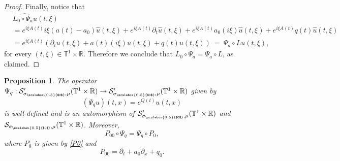 \documentclass[11pt,reqno]{amsart}
\numberwithin{equation}{section}
\newtheorem{prop}[theorem]{Proposition}
\theoremstyle{definition}
\theoremstyle{definition}
\newcommand{\T}{\mathbb{T}}
\newcommand{\R}{\mathbb{R}}
\newcommand{\g}{\mathbb{T}^1\times\mathbb{R}}
\newcommand{\scoef}{\mathcal{S}_{\sigma_{\scalebox{0.5}{$0$}},\mu}(\g)}
\newcommand{\sscoef}{\mathcal{S}'_{\sigma_{\scalebox{0.5}{$0$}},\mu}(\g)}
\begin{document}
\begin{proof}
          Finally, notice that 
     \begin{align*}
         & \widehat{L_{0}\circ\Psi_a u}(t,\xi) \\
         & =e^{i\xi A(t)}i\xi(a(t)-a_0)\widehat{u}(t,\xi)+e^{i\xi A(t)}\partial_t\widehat{u}(t,\xi)+e^{i\xi A(t)}a_0(i\xi)\widehat{u}(t,\xi)+e^{i\xi A(t)}q(t)\widehat{u}(t,\xi) \\
         & =e^{i\xi A(t)}(\partial_tu(t,\xi)+a(t)(i\xi)u(t,\xi)+q(t)u(t,\xi)) \ =\ \widehat{\Psi_a\circ L u}(t,\xi),
     \end{align*}
     for every $(t,\xi)\in\T^1\times \R$. Therefore we conclude that $L_0\circ\Psi_a=\Psi_a\circ L$, as claimed.
\end{proof}



\begin{prop}\label{prop_Psiq}
    The operator $\Psi_q:\sscoef\to\sscoef$ given by
    \[(\Psi_q u)(t,x) = e^{Q(t)}u(t,x)\]
    is well-defined and is an automorphism of $\sscoef$ and $\scoef$. Moreover,
    \[P_{00}\circ\Psi_q = \Psi_q\circ P_0,\]
    where $P_0$ is given by \eqref{P0} and
    \begin{equation}\label{P00}
    P_{00} = \partial_t+a_0\partial_x+q_0.
    \end{equation}
\end{prop}
\end{document}

